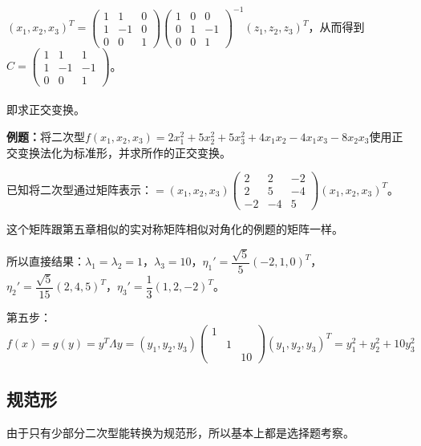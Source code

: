 $(x_1,x_2,x_3)^T=\left(\begin{array}{ccc}
    1 & 1 & 0 \\
    1 & -1 & 0 \\
    0 & 0 & 1
\end{array}\right)\left(\begin{array}{ccc}
    1 & 0 & 0 \\
    0 & 1 & -1 \\
    0 & 0 & 1
\end{array}\right)^{-1}(z_1,z_2,z_3)^T$，从而得到$C=\left(\begin{array}{ccc}
    1 & 1 & 1 \\
    1 & -1 & -1 \\
    0 & 0 & 1
\end{array}\right)$。

\paragraph{}

即求正交变换。

\textbf{例题：}将二次型$f(x_1,x_2,x_3)=2x_1^2+5x_2^2+5x_3^2+4x_1x_2-4x_1x_3-8x_2x_3$使用正交变换法化为标准形，并求所作的正交变换。

已知将二次型通过矩阵表示：$=(x_1,x_2,x_3)\left(\begin{array}{ccc}
    2 & 2 & -2 \\
    2 & 5 & -4 \\
    -2 & -4 & 5
\end{array}\right)(x_1,x_2,x_3)^T$。\medskip

这个矩阵跟第五章相似的实对称矩阵相似对角化的例题的矩阵一样。

所以直接结果：$\lambda_1=\lambda_2=1$，$\lambda_3=10$，$\eta_1'=\dfrac{\sqrt{5}}{5}(-2,1,0)^T$，$\eta_2'=\dfrac{\sqrt{5}}{15}(2,4,5)^T$，$\eta_3'=\dfrac{1}{3}(1,2,-2)^T$。

第五步：$f(x)=g(y)=y^T\Lambda y=(y_1,y_2,y_3)\left(\begin{array}{ccc}
    1 \\
     & 1 \\
     & & 10
\end{array}\right)(y_1,y_2,y_3)^T=y_1^2+y_2^2+10y_3^2$

\subsection{规范形}

由于只有少部分二次型能转换为规范形，所以基本上都是选择题考察。

